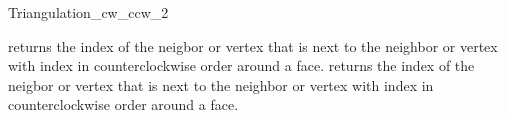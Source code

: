 \begin{ccRefClass}{Triangulation_cw_ccw_2}

\ccOperations
{}
{returns the index of the  neigbor or vertex that is  next to 
the neighbor or vertex with index 
in counterclockwise order around a face.}
\ccGlue
{}
{returns the index of the  neigbor or vertex that is  next to 
the neighbor or vertex with index 
in counterclockwise order around a face.}

\ccSeeAlso
{} \\
 \\

\end{ccRefClass}


